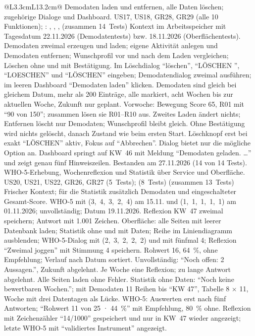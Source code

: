 \begin{longtable}{@{}L{3.3cm}L{13.2cm}@{}}
  \midrule
    {Demodaten laden und entfernen, alle Daten löschen; zugehörige Dialoge und Dashboard.}
    {US17, US18, GR28, GR29}
    { (alle 10 Funktionen); : , , ,  (zusammen 14~Tests)}
    {Kontext im Arbeitsspeicher mit Tagesdatum 22.11.2026 (Demodatentests) bzw. 18.11.2026 (Oberflächentests).}
    {Demodaten zweimal erzeugen und laden; eigene Aktivität anlegen und Demodaten entfernen; Wunschprofil vor und nach dem Laden vergleichen; Löschen ohne und mit Bestätigung. Im Löschdialog \enquote{löschen}, \enquote{LÖSCHEN }, \enquote{LOESCHEN} und \enquote{LÖSCHEN} eingeben; Demodatendialog zweimal ausführen; im leeren Dashboard \enquote{Demodaten laden} klicken.}
    {Demodaten sind gleich bei gleichem Datum, mehr als 200 Einträge, alle markiert, acht Wochen bis zur aktuellen Woche, Zukunft nur geplant. Vorwoche: Bewegung Score 65, R01 mit \enquote{90 von 150}; zusammen lösen sie R01--R10 aus. Zweites Laden ändert nichts; Entfernen löscht nur Demodaten; Wunschprofil bleibt gleich. Ohne Bestätigung wird nichts gelöscht, danach Zustand wie beim ersten Start. Löschknopf erst bei exakt \enquote{LÖSCHEN} aktiv, Fokus auf \enquote{Abbrechen}. Dialog bietet nur die mögliche Option an. Dashboard springt auf KW~46 mit Meldung \enquote{Demodaten geladen. \dots} und zeigt genau fünf Hinweiszeilen.}
    {Bestanden am 27.11.2026 (14 von 14 Tests).}
  \midrule
    {WHO-5-Erhebung, Wochenreflexion und Statistik über Service und Oberfläche.}
    {US20, US21, US22, GR26, GR27}
    { (5~Tests);  (8~Tests) (zusammen 13~Tests)}
    {Frischer Kontext; für die Statistik zusätzlich Demodaten und eingeschalteter Gesamt-Score.}
    {WHO-5 mit (3,~4,~3,~2,~4) am 15.11. und (1,~1,~1,~1,~1) am 01.11.2026; unvollständig; Datum 19.11.2026. Reflexion KW~47 zweimal speichern; Antwort mit 1.001 Zeichen. Oberfläche: alle Seiten mit leerer Datenbank laden; Statistik ohne und mit Daten; Reihe im Liniendiagramm ausblenden; WHO-5-Dialog mit (2,~3,~2,~2,~2) und mit fünfmal 4; Reflexion \enquote{Zweimal joggen} mit Stimmung 4 speichern.}
    {Rohwert 16, 64~\%, ohne Empfehlung; Verlauf nach Datum sortiert. Unvollständig: \enquote{Noch offen: 2 Aussagen.}, Zukunft abgelehnt. Je Woche eine Reflexion; zu lange Antwort abgelehnt. Alle Seiten laden ohne Fehler. Statistik ohne Daten: \enquote{Noch keine bewertbaren Wochen.}; mit Demodaten 11 Reihen bis \enquote{KW 47}, Tabelle 8 $\times$ 11, Woche mit drei Datentagen als Lücke. WHO-5: Auswerten erst nach fünf Antworten; \enquote{Rohwert 11 von 25 · 44~\%} mit Empfehlung, 80~\% ohne. Reflexion mit Zeichenzähler \enquote{14/1000} gespeichert und nur in KW~47 wieder angezeigt; letzte WHO-5 mit \enquote{validiertes Instrument} angezeigt.}

\end{longtable}

